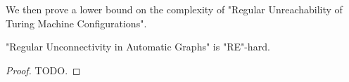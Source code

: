We then prove a lower bound on the complexity of "Regular Unreachability of Turing Machine Configurations".

\begin{lemma}
	\AP\label{lemma:regular-unconnectivity-lowerbound}
	"Regular Unconnectivity in Automatic Graphs" is "RE"-hard.
\end{lemma}

\begin{proof}
	TODO.


\end{proof}
